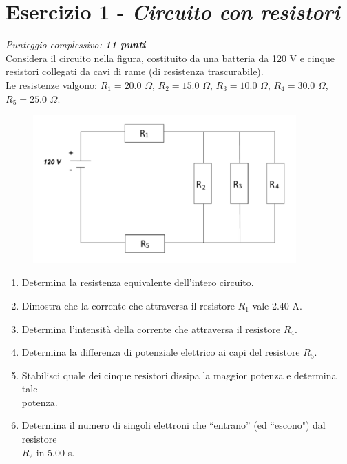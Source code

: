 \documentclass{article}
\begin{document}
\pagebreak

\section*{Esercizio 1 - \textit{Circuito con resistori}}
\vspace{-3mm} {\textit{Punteggio complessivo: \textbf{11 punti}}} \vspace{5mm} \\
Considera il circuito nella figura, costituito da una batteria da 120 V
e cinque resistori collegati da cavi di rame (di resistenza trascurabile). \\
Le resistenze valgono: ${R_1} = 20.0$ $\Omega$, ${R_2} = 15.0$ $\Omega$, 
${R_3} = 10.0$ $\Omega$, ${R_4} = 30.0$ $\Omega$, ${R_5} = 25.0$ $\Omega$.

\vspace{1cm}
\begin{figure}[h]
    \centering
    \includegraphics[width=0.9\textwidth]{Esercizio 1.png}
\end{figure}
\vspace{1cm}

\begin{enumerate}[label=\textbf{\alph*)}]
    \item Determina la resistenza equivalente dell'intero circuito.
    \item Dimostra che la corrente che attraversa il resistore $R_1$ vale 2.40 A.
    \item Determina l'intensità della corrente che attraversa il resistore $R_4$.
    \item Determina la differenza di potenziale elettrico ai capi del resistore $R_5$.
    \item Stabilisci quale dei cinque resistori dissipa la maggior potenza e
        determina tale \\ potenza.
    \item Determina il numero di singoli elettroni che ``entrano'' (ed ``escono")
        dal resistore \\ $R_2$ in 5.00 s.
\end{enumerate}
\end{document}
